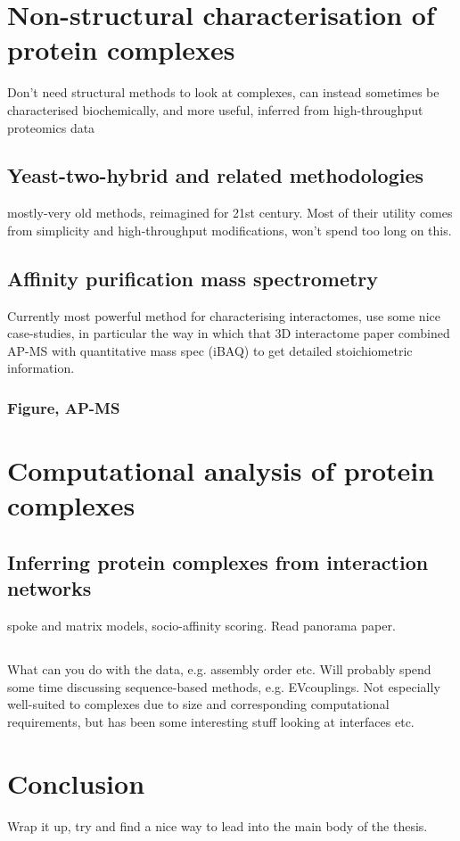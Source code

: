 \documentclass[a4paper,11pt,twoside,openright]{scrbook}
\let\cite\supercite
\begin{document}
\section{Non-structural characterisation of protein complexes}
Don't need structural methods to look at complexes, can instead sometimes be characterised biochemically, and more useful, inferred from high-throughput proteomics data

\subsection{Yeast-two-hybrid and related methodologies}
mostly-very old methods, reimagined for 21st century. Most of their utility comes from simplicity and high-throughput modifications, won't spend too long on this.

\subsection{Affinity purification mass spectrometry}
Currently most powerful method for characterising interactomes, use some nice case-studies, in particular the way in which that 3D interactome paper \cite{Hein2015} combined AP-MS with quantitative mass spec (iBAQ) to get detailed stoichiometric information.

\subsubsection{Figure, AP-MS}

\section{Computational analysis of protein complexes}
\subsection{Inferring protein complexes from interaction networks}
spoke and matrix models, socio-affinity scoring. Read panorama paper. \cite{Wan2015}
\subsection{}
What can you do with the data, e.g. assembly order etc. Will probably spend some time discussing sequence-based methods, e.g. EVcouplings. Not especially well-suited to complexes due to size and corresponding computational requirements, but has been some interesting stuff looking at interfaces etc.

\section{Conclusion}
Wrap it up, try and find a nice way to lead into the main body of the thesis.

\printbibliography
\end{document}
